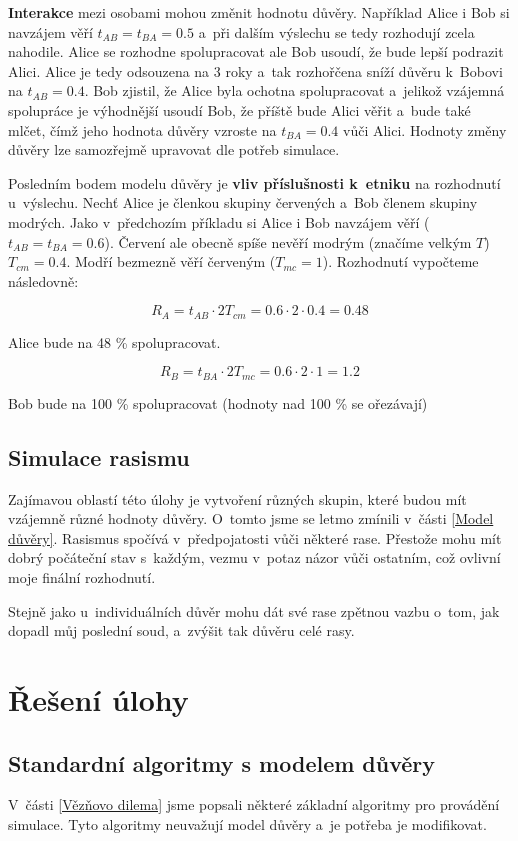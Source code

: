 \documentclass[pdftex,a4paper,12pt]{extarticle}
\begin{document}
\textbf{Interakce} mezi osobami mohou změnit hodnotu důvěry. Například Alice i Bob si navzájem věří $t_{AB} = t_{BA} = 0.5$ a~při dalším výslechu se tedy rozhodují zcela nahodile. Alice se rozhodne spolupracovat ale Bob usoudí, že bude lepší podrazit Alici. Alice je tedy odsouzena na 3 roky a~tak rozhořčena sníží důvěru k~Bobovi na $t_{AB} = 0.4$. Bob zjistil, že Alice byla ochotna spolupracovat a~jelikož vzájemná spolupráce je výhodnější usoudí Bob, že příště bude Alici věřit a~bude také mlčet, čímž jeho hodnota důvěry vzroste na $t_{BA} = 0.4$ vůči Alici. Hodnoty změny důvěry lze samozřejmě upravovat dle potřeb simulace.

Posledním bodem modelu důvěry je \textbf{vliv příslušnosti k~etniku} na rozhodnutí u~výslechu. Nechť Alice je členkou skupiny červených a~Bob členem skupiny modrých. Jako v~předchozím příkladu si Alice i Bob navzájem věří ($t_{AB} = t_{BA} = 0.6$). Červení ale obecně spíše nevěří modrým (značíme velkým $T$) $T_{cm} = 0.4$. Modří bezmezně věří červeným ($T_{mc} = 1$). Rozhodnutí vypočteme následovně:

$$R_A = t_{AB} \cdot 2T_{cm} = 0.6 \cdot 2 \cdot 0.4 = 0.48$$

Alice bude na 48 \% spolupracovat.

$$R_B = t_{BA} \cdot 2T_{mc} = 0.6 \cdot 2 \cdot 1 = 1.2$$

Bob bude na 100 \% spolupracovat (hodnoty nad 100 \% se ořezávají)


\subsection{Simulace rasismu}
\label{Simulace rasismu}
Zajímavou oblastí této úlohy je vytvoření různých skupin, které budou mít vzájemně různé hodnoty důvěry. O~tomto jsme se letmo zmínili v~části \ref{Model důvěry}. Rasismus spočívá v~předpojatosti vůči některé rase. Přestože mohu mít dobrý počáteční stav s~každým, vezmu v~potaz názor  vůči ostatním, což ovlivní moje finální rozhodnutí. 

Stejně jako u~individuálních důvěr mohu dát své rase zpětnou vazbu o~tom, jak dopadl můj poslední soud, a~zvýšit tak důvěru celé rasy.


\newpage
\section{Řešení úlohy}
\label{Řešení úlohy}

\subsection{Standardní algoritmy s modelem důvěry}
\label{Standardní algoritmy s modelem důvěry}
V~části \ref{Vězňovo dilema} jsme popsali některé základní algoritmy pro provádění simulace. Tyto algoritmy neuvažují model důvěry a~je potřeba je modifikovat. 
\end{document}
